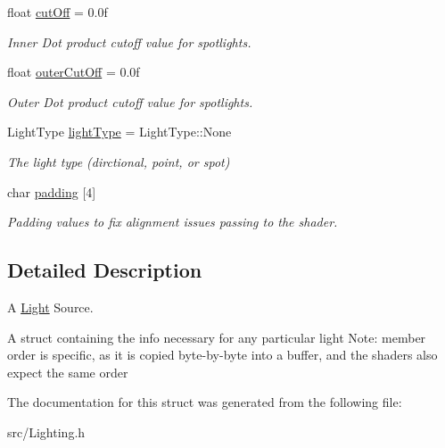 \begin{DoxyCompactItemize}
\mbox{\label{struct_light_ac332a2fd5bc62656f30f95b9fcb35e42}} 
float \mbox{\hyperlink{struct_light_ac332a2fd5bc62656f30f95b9fcb35e42}{cut\+Off}} = 0.\+0f
\begin{DoxyCompactList}\small\item\em Inner Dot product cutoff value for spotlights. \end{DoxyCompactList}\item 
\mbox{\label{struct_light_ae1b428a65d7a814fed9587c231b624e4}} 
float \mbox{\hyperlink{struct_light_ae1b428a65d7a814fed9587c231b624e4}{outer\+Cut\+Off}} = 0.\+0f
\begin{DoxyCompactList}\small\item\em Outer Dot product cutoff value for spotlights. \end{DoxyCompactList}\item 
\mbox{\label{struct_light_ab0c279c927973443f7b52fc924b489aa}} 
Light\+Type \mbox{\hyperlink{struct_light_ab0c279c927973443f7b52fc924b489aa}{light\+Type}} = Light\+Type\+::\+None
\begin{DoxyCompactList}\small\item\em The light type (dirctional, point, or spot) \end{DoxyCompactList}\item 
\mbox{\label{struct_light_a380e4b1feffdcac4a45ced488173892d}} 
char \mbox{\hyperlink{struct_light_a380e4b1feffdcac4a45ced488173892d}{padding}} \mbox{[}4\mbox{]}
\begin{DoxyCompactList}\small\item\em Padding values to fix alignment issues passing to the shader. \end{DoxyCompactList}\end{DoxyCompactItemize}


\subsection{Detailed Description}
A \mbox{\hyperlink{struct_light}{Light}} Source. 

A struct containing the info necessary for any particular light Note\+: member order is specific, as it is copied byte-\/by-\/byte into a buffer, and the shaders also expect the same order 

The documentation for this struct was generated from the following file\+:\begin{DoxyCompactItemize}
\item 
src/Lighting.\+h\end{DoxyCompactItemize}

